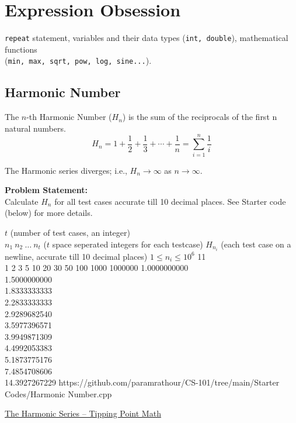 \section{Expression Obsession}{\label{sec:expressionobsession}}
\begin{topics}
\verb!repeat! statement, variables and their data types (\verb!int, double!), mathematical functions \\(\verb!min, max, sqrt, pow, log, sine...!).
\end{topics}
\subsection{Harmonic Number}{\label{pp:harmonic}}
The $n$-th Harmonic Number ($H_n$) is the sum of the reciprocals of the first n natural numbers.
\begin{equation}
{H_{n}=1+{\frac {1}{2}}+{\frac {1}{3}}+\cdots +{\frac {1}{n}}=\sum _{i=1}^{n}{\frac {1}{i}}}
\end{equation}
\begin{fact}
The Harmonic series diverges; i.e., $H_n \rightarrow\infty$ as $n\rightarrow\infty$.
\end{fact}
\textbf{Problem Statement:}\\
Calculate $H_n$ for all test cases accurate till 10 decimal places. See Starter code (below) for more details.
\begin{testcases}
	{$t$ \hfill(number of test cases, an integer)\\
	$n_1\ n_2\ \ldots\ n_t$ \hfill($t$ space seperated integers for each testcase)}
	{$H_{n_i}$ \hfill(each test case on a newline, accurate till 10 decimal places)}
	{$1 \leq n_i \leq 10^{6}$}
	{11\\1 2 3 5 10 20 30 50 100 1000 1000000}
	{1.0000000000\\1.5000000000\\1.8333333333\\2.2833333333\\2.9289682540\\3.5977396571\\3.9949871309\\4.4992053383\\5.1873775176\\7.4854708606\\14.3927267229}
	{https://github.com/paramrathour/CS-101/tree/main/Starter Codes/Harmonic Number.cpp}
\end{testcases}
\begin{funvideo}
\href{https://youtu.be/Dgcoa2yAUfw}{The Harmonic Series -- Tipping Point Math}
\end{funvideo}
